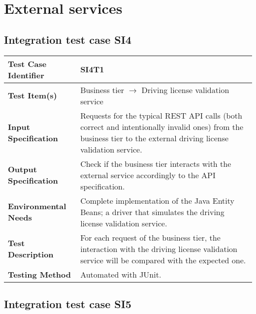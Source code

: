 \section{External services}
\subsection{Integration test case SI4}

\begin{tabular}{l p{}}
    \hline
    \textbf{Test Case Identifier} & SI4T1\\
    \hline
    \textbf{Test Item(s)} & Business tier $\rightarrow$ Driving license validation service\\
    \hline
    \textbf{Input Specification} & Requests for the typical REST API calls (both correct and intentionally invalid ones) from the business tier to the external driving license validation service.\\
    \hline
    \textbf{Output Specification} & Check if the business tier interacts with the external service accordingly to the API specification.\\
    \hline
    \textbf{Environmental Needs} & Complete implementation of the Java Entity Beans; a driver that simulates the driving license validation service. \\
    \hline
    \textbf{Test Description} & For each request of the business tier, the interaction with the driving license validation service will be compared with the expected one.\\
    \hline
    \textbf{Testing Method} & Automated with JUnit.\\
    \hline
\end{tabular}

\vspace{2em}

\subsection{Integration test case SI5}
\label{sec:performance-business}

